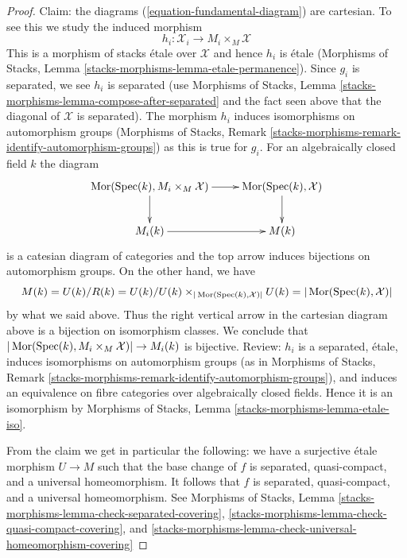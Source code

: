 \begin{proof}
\medskip\noindent
Claim: the diagrams (\ref{equation-fundamental-diagram}) are cartesian.
To see this we study the induced morphism
$$
h_i : \mathcal{X}_i \longrightarrow M_i \times_M \mathcal{X}
$$
This is a morphism of stacks \'etale over $\mathcal{X}$
and hence $h_i$ is \'etale (Morphisms of Stacks, Lemma
\ref{stacks-morphisms-lemma-etale-permanence}).
Since $g_i$ is separated, we see $h_i$ is separated
(use Morphisms of Stacks, Lemma
\ref{stacks-morphisms-lemma-compose-after-separated} and the fact
seen above that the diagonal of $\mathcal{X}$ is separated).
The morphism $h_i$ induces isomorphisms on automorphism groups
(Morphisms of Stacks, Remark
\ref{stacks-morphisms-remark-identify-automorphism-groups})
as this is true for $g_i$. For an algebraically closed field $k$
the diagram
$$
\xymatrix{
\Mor(\Spec(k), M_i \times_M \mathcal{X}) \ar[r] \ar[d] &
\Mor(\Spec(k), \mathcal{X}) \ar[d] \\
M_i(k) \ar[r] &
M(k)
}
$$
is a catesian diagram of categories and the top arrow
induces bijections on automorphism groups.
On the other hand, we have
$$
M(k) = U(k)/R(k) = U(k)/
U(k) \times_{|\mathop{\mathrm{Mor}}\nolimits(\mathop{\mathrm{Spec}}(k), \mathcal{X})|} U(k) =
|\mathop{\mathrm{Mor}}\nolimits(\mathop{\mathrm{Spec}}(k), \mathcal{X})|
$$
by what we said above. Thus the right vertical arrow in the
cartesian diagram above is a bijection on isomorphism classes.
We conclude that
$|\mathop{\mathrm{Mor}}\nolimits(\mathop{\mathrm{Spec}}(k), M_i \times_M \mathcal{X})| \to M_i(k)$ is bijective.
Review: $h_i$ is a separated, \'etale, induces isomorphisms on
automorphism groups (as in Morphisms of Stacks, Remark
\ref{stacks-morphisms-remark-identify-automorphism-groups}), and
induces an equivalence on fibre categories over algebraically closed fields.
Hence it is an isomorphism by Morphisms of Stacks, Lemma
\ref{stacks-morphisms-lemma-etale-iso}.

\medskip\noindent
From the claim we get in particular the following:
we have a surjective \'etale morphism $U \to M$
such that the base change of $f$ is separated, quasi-compact,
and a universal homeomorphism. It follows that $f$ is separated,
quasi-compact, and a universal homeomorphism.
See Morphisms of Stacks, Lemma
\ref{stacks-morphisms-lemma-check-separated-covering},
\ref{stacks-morphisms-lemma-check-quasi-compact-covering}, and
\ref{stacks-morphisms-lemma-check-universal-homeomorphism-covering}


\end{proof}
